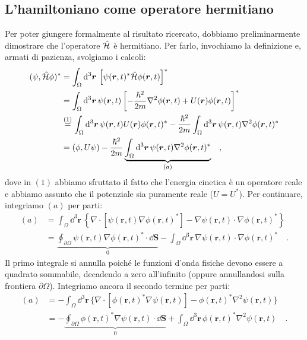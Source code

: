 \subsection{L'hamiltoniano come operatore hermitiano}
Per poter giungere formalmente al risultato ricercato, dobbiamo preliminarmente dimostrare che l'operatore $\hat{\mathcal{H}}$ è hermitiano. Per farlo, invochiamo la definizione e, armati di pazienza, svolgiamo i calcoli:
\[
\begin{aligned}
    (\psi, \hat{\mathcal{H}}\phi)^* &= \int_\Omega \dd^3{\bm{r}} \, \left[\psi(\bm{r},t)^* \hat{\mathcal{H}}\phi(\bm{r},t)\right]^* \\
    &= \int_\Omega \dd^3{\bm{r}} \, \psi(\bm{r},t) \left[ -\frac{\hbar^2}{2m}\nabla^2\phi(\bm{r},t) + U(\bm{r})\phi(\bm{r},t)\right]^* \\
    &\overset{(1)}{=} \int_\Omega \dd^3{\bm{r}} \, \psi(\bm{r},t) U(\bm{r}) \phi(\bm{r},t)^*  -\frac{\hbar^2}{2m}\int_\Omega \dd^3{\bm{r}} \, \psi(\bm{r},t) \nabla^2 \phi(\bm{r},t)^*\\
    &= (\phi, U\psi) - \frac{\hbar^2}{2m} \underbrace{\int_\Omega \dd^3{\bm{r}} \, \psi(\bm{r},t) \nabla^2 \phi(\bm{r},t)^*}_{(a)} \quad,
\end{aligned}
\]
dove in $(1)$ abbiamo sfruttato il fatto che l'energia cinetica è un operatore reale e abbiamo assunto che il potenziale sia puramente reale ($U = U^*$). Per continuare, integriamo $(a)$ per parti:
\[
\begin{aligned}
    (a) &= \int_\Omega \dd^3{\bm{r}} \, \left\{ \nabla \cdot[\psi(\bm{r},t)\nabla\phi(\bm{r},t)^*] - \nabla \psi(\bm{r},t) \cdot \nabla\phi(\bm{r},t)^* \right\} \\
    &= \underbrace{\oint_{\partial\Omega} \psi(\bm{r},t)\nabla\phi(\bm{r},t)^* \cdot \dd{\bm{S}}}_{0} - \int_\Omega \dd^3{\bm{r}} \, \nabla \psi(\bm{r},t) \cdot \nabla\phi(\bm{r},t)^* \quad.
\end{aligned}
\] 
Il primo integrale si annulla poiché le funzioni d'onda fisiche devono essere a quadrato sommabile, decadendo a zero all'infinito (oppure annullandosi sulla frontiera $\partial\Omega$). Integriamo ancora il secondo termine per parti:
\[
    \begin{aligned}
       (a) &= - \int_\Omega \dd^3{\bm{r}} \, \{\nabla\cdot [\phi(\bm{r},t)^*\nabla\psi(\bm{r},t)] - \phi(\bm{r},t)^*\nabla^2\psi(\bm{r},t) \} \\
       &= -\underbrace{\oint_{\partial\Omega} \phi(\bm{r},t)^*\nabla\psi(\bm{r},t) \cdot \dd{\bm{S}}}_0 + \int_\Omega \dd^3{\bm{r}} \, \phi(\bm{r},t)^*\nabla^2\psi(\bm{r},t) \quad.
    \end{aligned}
\]
